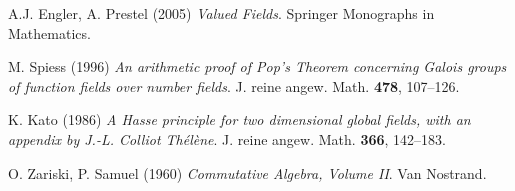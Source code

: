 \begin{thebibliography}{999999}

    A.J. Engler, A. Prestel (2005)
    \textit{Valued Fields}.
    Springer Monographs in Mathematics.

	M. Spiess (1996)
	\textit{An arithmetic proof of Pop's Theorem concerning Galois groups of function fields over number fields}.
    J. reine angew. Math. \textbf{478}, 107\---126.
   
    K. Kato (1986)
    \textit{A Hasse principle for two dimensional global fields, with an appendix by J.-L. Colliot Thélène}.
    J. reine angew. Math. \textbf{366}, 142\---183.
    
    O. Zariski, P. Samuel (1960)
    \textit{Commutative Algebra, Volume II}. 
    Van Nostrand. 

\end{thebibliography}
